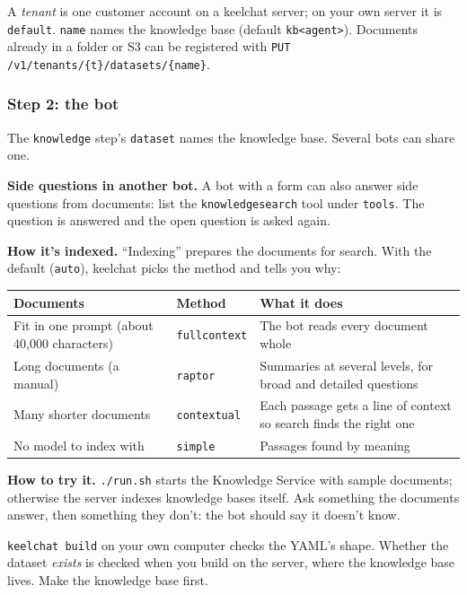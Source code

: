 \documentclass[11pt,a4paper]{article}
\newcommand{\snip}[1]{}
\newcommand{\codeus}{\textunderscore\allowbreak}
\newcommand{\code}[1]{{\renewcommand{\_}{\codeus}\texttt{\upshape #1}}}
\newcommand{\key}[1]{{\renewcommand{\_}{\codeus}\texttt{\color{ckey}#1}}}
\begin{document}
A \emph{tenant} is one customer account on a keelchat server; on your own server it is \code{default}.
\code{name} names the knowledge base (default \code{kb\_<agent>}). Documents already in a folder or S3 can be
registered with \code{PUT /v1/tenants/\{t\}/datasets/\{name\}}.

\subsubsection{Step 2: the bot}

\snip{05_knowledge.yaml}

The \key{knowledge} step's \key{dataset} names the knowledge base. Several bots can share one.

\textbf{Side questions in another bot.} A bot with a form can also answer side questions from documents: list the
\code{knowledge\_search} tool under \key{tools}. The question is answered and the open question is asked again.

\snip{05b_knowledge_shared.yaml}

\textbf{How it's indexed.} ``Indexing'' prepares the documents for search. With the default (\code{auto}), keelchat
picks the method and tells you why:

\begin{center}
\small
\begin{tabularx}{\textwidth}{@{}L{4.4cm}L{2.6cm}Y@{}}
\toprule
\textbf{Documents} & \textbf{Method} & \textbf{What it does} \\
\midrule
Fit in one prompt (about 40,000 characters) & \code{full\_context} & The bot reads every document whole \\
Long documents (a manual) & \code{raptor} & Summaries at several levels, for broad and detailed questions \\
Many shorter documents & \code{contextual} & Each passage gets a line of context so search finds the right one \\
No model to index with & \code{simple} & Passages found by meaning \\
\bottomrule
\end{tabularx}
\end{center}

\textbf{How to try it.} \code{./run.sh} starts the Knowledge Service with sample documents; otherwise the server
indexes knowledge bases itself. Ask something the documents answer, then something they don't: the bot should say
it doesn't know.

\begin{warn}
\code{keelchat build} on your own computer checks the YAML's shape. Whether the dataset \emph{exists} is checked
when you build on the server, where the knowledge base lives. Make the knowledge base first.
\end{warn}
\end{document}
